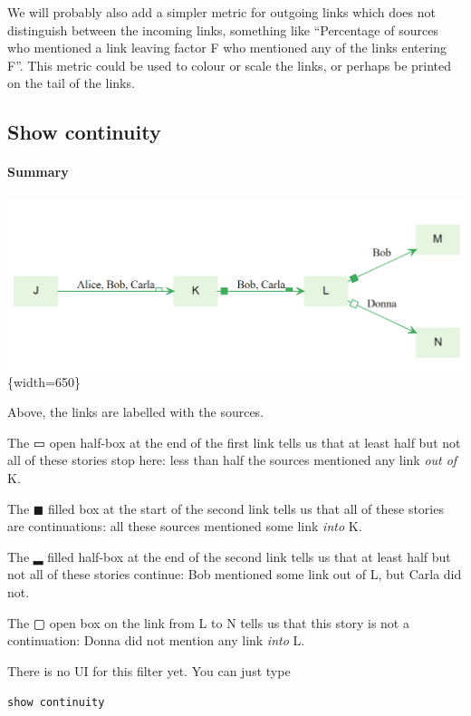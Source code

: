 \documentclass[
]{book}
\begin{document}
We will probably also add a simpler metric for outgoing links which does not distinguish between the incoming links, something like ``Percentage of sources who mentioned a link leaving factor F who mentioned any of the links entering F''. This metric could be used to colour or scale the links, or perhaps be printed on the tail of the links.

\hypertarget{show-continuity}{%
\subsection{Show continuity}\label{show-continuity}}

\hypertarget{summary-11}{%
\paragraph{Summary}\label{summary-11}}

\includegraphics[width=6.77083in,height=\textheight]{_assets/image-20211222121147473.png}\{width=650\}

Above, the links are labelled with the sources.

The ▭ open half-box at the end of the first link tells us that at least half but not all of these stories stop here: less than half the sources mentioned any link \emph{out of} K.

The ◼ filled box at the start of the second link tells us that all of these stories are continuations: all these sources mentioned some link \emph{into} K.

The ▂ filled half-box at the end of the second link tells us that at least half but not all of these stories continue: Bob mentioned some link out of L, but Carla did not.

The ▢ open box on the link from L to N tells us that this story is not a continuation: Donna did not mention any link \emph{into} L.

There is no UI for this filter yet. You can just type

\texttt{show\ continuity}
\end{document}
